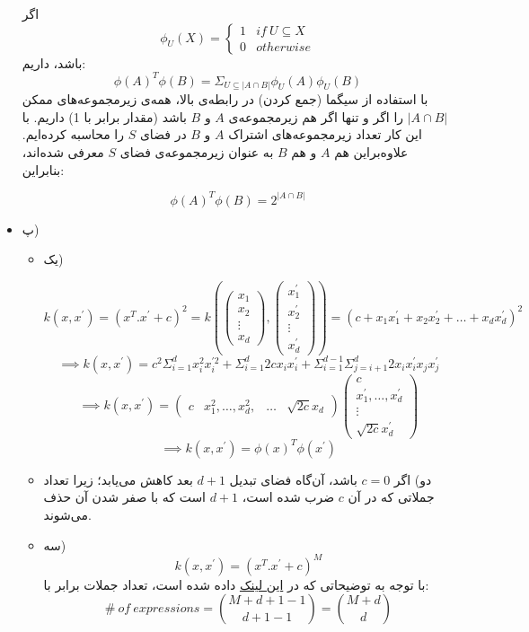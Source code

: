 \begin{itemize}
	اگر
	$$
	\phi_U(X) = \begin{cases}
	1 & if \: U \subseteq X \\
	0 & otherwise
	\end{cases}
	$$
	باشد، داریم:
	$$
	\phi(A)^T \phi(B) = \Sigma_{U \subseteq | A \cap B | } \phi_U(A)\phi_U(B)
	$$
	با استفاده از سیگما (جمع کردن) در رابطه‌ی بالا، همه‌ی زیرمجموعه‌های ممکن 
	$ |A \cap B| $
	را	اگر و تنها اگر هم زیرمجموعه‌ی $A$ و $B$ باشد (مقدار برابر با 1) داریم. با این کار تعداد زیرمجموعه‌های اشتراک $A$ و $B$  در فضای $S$ را محاسبه کرده‌ایم. علاوه‌براین هم $A$ و هم $B$ به عنوان زیرمجموعه‌ی فضای $S$ معرفی شده‌اند، بنابراین:
	
	$$
	\phi(A)^T \phi(B) = 2^{|A \cap B|}
	$$
	\item پ)
	\begin{itemize}
		\item یک) 
		
		$$
		k(x, x^\prime) = (x^T.x^\prime + c)^2 = k(
		\begin{pmatrix}
		x_1 \\ x_2 \\ \vdots \\ x_d
		\end{pmatrix},
		\begin{pmatrix}
		x_1^\prime\\
		x_2^\prime \\
		\vdots \\
		x_d^\prime
		\end{pmatrix}
		) = (c + x_1x_1^\prime + x_2x_2^\prime + \dots + x_dx_d^\prime)^2 
		$$
		$$
		\implies k(x, x^\prime) = c^2 \Sigma_{i = 1}^d x_i^2x_i^{\prime 2} + \Sigma_{i = 1}^d 2cx_ix_i^\prime + \Sigma_{i = 1}^{d - 1}\Sigma_{j = i + 1}^d 2x_ix_i^\prime x_j x_j^\prime
		$$
		$$
		\implies k(x, x^\prime) = \begin{pmatrix}
		c & 
		x_1^2, \dots, x_d^2, & \dots & \sqrt{2c}x_d
		\end{pmatrix}
		\begin{pmatrix}
		c \\
		x_1^\prime, \dots, x_d^\prime \\
		\vdots \\
		\sqrt{2c}x_d^\prime
		\end{pmatrix}
		$$
		$$
		\implies k(x, x^\prime) = \phi(x)^T\phi(x^\prime)
		$$
		\item دو)
		اگر 
		$c = 0$
		باشد، آن‌گاه فضای تبدیل $d+1$ بعد کاهش می‌یابد؛ زیرا تعداد جملاتی که در آن $c$ ضرب شده است، $d+1$ است که با صفر شدن آن حذف می‌شوند.
		\item سه)
		$$
		k(x, x^\prime) = (x^T.x^\prime + c)^M
		$$
		با توجه به توضیحاتی که در 
		\href{https://en.wikipedia.org/wiki/Multinomial_theorem}{این لینک} داده شده است، تعداد جملات برابر با:
		$$
		\# \: of \: expressions = \binom{M + d + 1 - 1}{d + 1 - 1} = \binom{M + d}{d}
		$$
	\end{itemize}
\end{itemize}